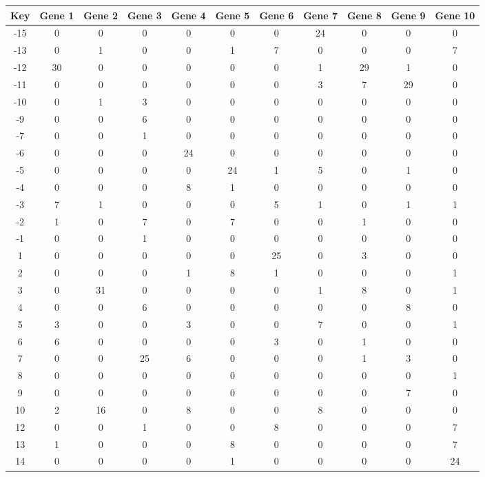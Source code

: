 \begin{tabular}{|c|c|c|c|c|c|c|c|c|c|c|}
\hline
Key & Gene 1 & Gene 2 & Gene 3 & Gene 4 & Gene 5 & Gene 6 & Gene 7 & Gene 8 & Gene 9 & Gene 10 \\
\hline
-15 & 0 & 0 & 0 & 0 & 0 & 0 & 24 & 0 & 0 & 0 \\
-13 & 0 & 1 & 0 & 0 & 1 & 7 & 0 & 0 & 0 & 7 \\
-12 & 30 & 0 & 0 & 0 & 0 & 0 & 1 & 29 & 1 & 0 \\
-11 & 0 & 0 & 0 & 0 & 0 & 0 & 3 & 7 & 29 & 0 \\
-10 & 0 & 1 & 3 & 0 & 0 & 0 & 0 & 0 & 0 & 0 \\
-9 & 0 & 0 & 6 & 0 & 0 & 0 & 0 & 0 & 0 & 0 \\
-7 & 0 & 0 & 1 & 0 & 0 & 0 & 0 & 0 & 0 & 0 \\
-6 & 0 & 0 & 0 & 24 & 0 & 0 & 0 & 0 & 0 & 0 \\
-5 & 0 & 0 & 0 & 0 & 24 & 1 & 5 & 0 & 1 & 0 \\
-4 & 0 & 0 & 0 & 8 & 1 & 0 & 0 & 0 & 0 & 0 \\
-3 & 7 & 1 & 0 & 0 & 0 & 5 & 1 & 0 & 1 & 1 \\
-2 & 1 & 0 & 7 & 0 & 7 & 0 & 0 & 1 & 0 & 0 \\
-1 & 0 & 0 & 1 & 0 & 0 & 0 & 0 & 0 & 0 & 0 \\
1 & 0 & 0 & 0 & 0 & 0 & 25 & 0 & 3 & 0 & 0 \\
2 & 0 & 0 & 0 & 1 & 8 & 1 & 0 & 0 & 0 & 1 \\
3 & 0 & 31 & 0 & 0 & 0 & 0 & 1 & 8 & 0 & 1 \\
4 & 0 & 0 & 6 & 0 & 0 & 0 & 0 & 0 & 8 & 0 \\
5 & 3 & 0 & 0 & 3 & 0 & 0 & 7 & 0 & 0 & 1 \\
6 & 6 & 0 & 0 & 0 & 0 & 3 & 0 & 1 & 0 & 0 \\
7 & 0 & 0 & 25 & 6 & 0 & 0 & 0 & 1 & 3 & 0 \\
8 & 0 & 0 & 0 & 0 & 0 & 0 & 0 & 0 & 0 & 1 \\
9 & 0 & 0 & 0 & 0 & 0 & 0 & 0 & 0 & 7 & 0 \\
10 & 2 & 16 & 0 & 8 & 0 & 0 & 8 & 0 & 0 & 0 \\
12 & 0 & 0 & 1 & 0 & 0 & 8 & 0 & 0 & 0 & 7 \\
13 & 1 & 0 & 0 & 0 & 8 & 0 & 0 & 0 & 0 & 7 \\
14 & 0 & 0 & 0 & 0 & 1 & 0 & 0 & 0 & 0 & 24 \\
\hline
\end{tabular}